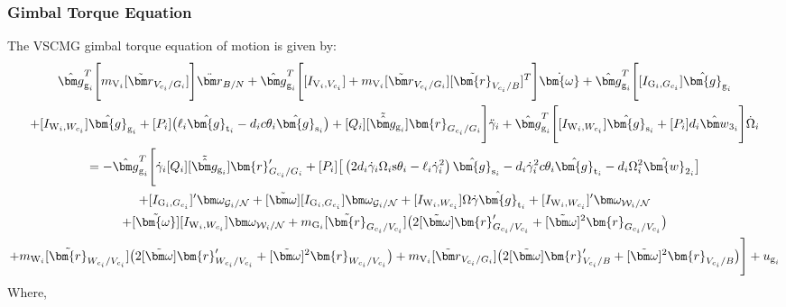 \subsubsection{Gimbal Torque Equation}
The VSCMG gimbal torque equation of motion is given by:
\begin{multline}
\hat{\bm g}_{\text{g}_i}^T \Bigg[ m_{\text{V}_i}[\tilde{\bm r}_{V_{c_i}/G_i}] \Bigg] \ddot{\bm r}_{B/N}
+ \hat{\bm g}_{\text{g}_i}^T \Bigg[ [I_{\text{V}_i,V_{c_i}}] + m_{\text{V}_i}[\tilde{\bm r}_{V_{c_i}/G_i}][\tilde{\bm{r}}_{V_{c_i}/B}]^T \Bigg] \dot{\bm{\omega}}
+ \hat{\bm g}_{\text{g}_i}^T \Bigg[ [I_{\text{G}_i,G_{c_i}}]\hat{\bm{g}}_{\text{g}_i}
\\+ [I_{\text{W}_i,W_{c_i}}]\hat{\bm{g}}_{\text{g}_i} + [P_i] \big(\ell_i\hat{\bm{g}}_{\text{t}_i} - d_ic\theta_i\hat{\bm{g}}_{\text{s}_i}\big) + [Q_i] [\tilde{\hat{\bm g}}_{\text{g}_i}]\bm{r}_{G_{c_i}/G_i} \Bigg] \ddot{\gamma}_i
+ \hat{\bm g}_{\text{g}_i}^T \Bigg[ [I_{\text{W}_i,W_{c_i}}]\hat{\bm{g}}_{\text{s}_i} + [P_i] d_i\hat{\bm w}_{3_i} \Bigg] \dot{\Omega}_i
\\ = - \hat{\bm g}_{\text{g}_i}^T \Bigg[ \dot{\gamma}_i[Q_i][\tilde{\hat{\bm g}}_{\text{g}_i}]\bm{r}'_{G_{c_i}/G_i} + [P_i] \big[\left(2d_i\dot{\gamma}_i\Omega_i\text{s}\theta_i - \ell_i\dot{\gamma}_i^2\right)\hat{\bm{g}}_{\text{s}_i} - d_i\dot{\gamma}_i^2c\theta_i\hat{\bm{g}}_{\text{t}_i} - d_i\Omega_i^2 \hat{\bm{w}}_{2_i}\big]
\\+[I_{\text{G}_i,G_{c_i}}]'\bm\omega_{\mathcal{G}_i/\cal N} + [\tilde{\bm\omega}][I_{\text{G}_i,G_{c_i}}]\bm\omega_{\mathcal{G}_i/\cal N} + [I_{\text{W}_i,W_{c_i}}]\Omega\dot{\gamma}\hat{\bm{g}}_{\text{t}_i} + [I_{\text{W}_i,W_{c_i}}]'\bm\omega_{\mathcal{W}_i/\cal N} \\+ [\tilde{\bm{\omega}}][I_{\text{W}_i,W_{c_i}}]\bm\omega_{\mathcal{W}_i/\cal N}
+ m_{\text{G}_i}[\tilde{\bm{r}}_{G_{c_i}/V_{c_i}}] \big( 2[\tilde{\bm\omega}]\bm{r}'_{G_{c_i}/V_{c_i}} + [\tilde{\bm\omega}]^2\bm{r}_{G_{c_i}/V_{c_i}}\big)
\\ + m_{\text{W}_i}[\tilde{\bm{r}}_{W_{c_i}/V_{c_i}}]\big( 2[\tilde{\bm\omega}]\bm{r}'_{W_{c_i}/V_{c_i}} + [\tilde{\bm\omega}]^2\bm{r}_{W_{c_i}/V_{c_i}}\big)
+ m_{\text{V}_i}[\tilde{\bm r}_{V_{c_i}/G_i}]\big( 2[\tilde{\bm\omega}]\bm{r}'_{V_{c_i}/B} + [\tilde{\bm\omega}]^2\bm{r}_{V_{c_i}/B} \big) \Bigg] + u_{\text{g}_i}
\label{eq:vscmgtorque}
\end{multline}
Where,
